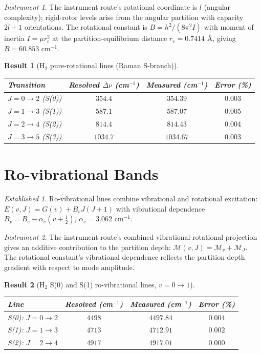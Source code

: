\documentclass[11pt,a4paper]{article}
\theoremstyle{stmtstyle}
\newtheorem{result}{Result}
\theoremstyle{definition}
\theoremstyle{remark}
\newtheorem*{established}{Established}
\newtheorem*{instrument}{Instrument}
\newcommand{\Depth}{\mathcal{M}}
\begin{document}
\begin{instrument}
The instrument route’s rotational coordinate is $l$ (angular complexity); rigid-rotor levels arise from the angular partition with capacity $2l+1$ orientations. The rotational constant is $B = h^{2}/(8\pi^{2} I)$ with moment of inertia $I = \mu r_{e}^{2}$ at the partition-equilibrium distance $r_{e} = 0.7414$ \AA, giving $B = 60.853$ cm$^{-1}$.
\end{instrument}

\begin{result}[H$_{2}$ pure-rotational lines (Raman S-branch)]\label{res:h2rot}
\begin{center}\small
\begin{tabular}{lccc}
\toprule
Transition & Resolved $\Delta\nu$ (cm$^{-1}$) & Measured (cm$^{-1}$) & Error (\%)\\
\midrule
$J=0\to 2$ (S(0))  & $354.4$  & $354.39$  & $0.003$\\
$J=1\to 3$ (S(1))  & $587.1$  & $587.07$  & $0.005$\\
$J=2\to 4$ (S(2))  & $814.4$  & $814.43$  & $0.004$\\
$J=3\to 5$ (S(3))  & $1034.7$ & $1034.67$ & $0.003$\\
\bottomrule
\end{tabular}
\end{center}
\end{result}

\section{Ro-vibrational Bands}
\label{sec:h2rovib}

\begin{established}
Ro-vibrational lines combine vibrational and rotational excitation: $E(v,J) = G(v) + B_{v} J(J+1)$ with vibrational dependence $B_{v} = B_{e} - \alpha_{e}(v + \tfrac{1}{2})$, $\alpha_{e} = 3.062$ cm$^{-1}$.
\end{established}

\begin{instrument}
The instrument route’s combined vibrational-rotational projection gives an additive contribution to the partition depth: $\Depth(v, J) = \Depth_{v} + \Depth_{J}$. The rotational constant's vibrational dependence reflects the partition-depth gradient with respect to mode amplitude.
\end{instrument}

\begin{result}[H$_{2}$ S(0) and S(1) ro-vibrational lines, $v=0\to 1$]\label{res:h2rovib}
\begin{center}\small
\begin{tabular}{lccc}
\toprule
Line & Resolved (cm$^{-1}$) & Measured (cm$^{-1}$) & Error (\%)\\
\midrule
S(0): $J=0\to 2$ & $4498$ & $4497.84$ & $0.004$\\
S(1): $J=1\to 3$ & $4713$ & $4712.91$ & $0.002$\\
S(2): $J=2\to 4$ & $4917$ & $4917.01$ & $0.000$\\
\bottomrule
\end{tabular}
\end{center}
\end{result}
\end{document}
